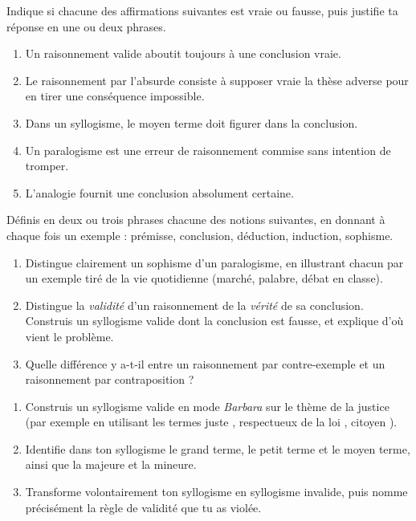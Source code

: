 \documentclass[11pt]{article}
\newcommand{\cle}[1]{{\popxbold\color{popdark}#1}}
\newcounter{popsec}
\newcounter{popsub}
\newcommand{\courssub}[1]{%
  \stepcounter{popsub}%
  \par\vspace{9pt}\noindent{\popxbold\fontsize{11.5}{13}\selectfont\color{popink}{\color{poporange}\thepopsec.\thepopsub}\hspace{6pt}#1}\par\nopagebreak\vspace{4pt}
}
\begin{document}
\begin{exercice}
Indique si chacune des affirmations suivantes est vraie ou fausse, puis justifie ta réponse en une ou deux phrases.

\begin{enumerate}
\item Un raisonnement valide aboutit toujours à une conclusion vraie.
\item Le raisonnement par l'absurde consiste à supposer vraie la thèse adverse pour en tirer une conséquence impossible.
\item Dans un syllogisme, le moyen terme doit figurer dans la conclusion.
\item Un paralogisme est une erreur de raisonnement commise sans intention de tromper.
\item L'analogie fournit une conclusion absolument certaine.
\end{enumerate}
\end{exercice}

\begin{exercice}[Définitions]
Définis en deux ou trois phrases chacune des notions suivantes, en donnant à chaque fois un exemple : \cle{prémisse}, \cle{conclusion}, \cle{déduction}, \cle{induction}, \cle{sophisme}.
\end{exercice}

\begin{exercice}
\begin{enumerate}
\item Distingue clairement un \cle{sophisme} d'un \cle{paralogisme}, en illustrant chacun par un exemple tiré de la vie quotidienne (marché, palabre, débat en classe).
\item Distingue la \emph{validité} d'un raisonnement de la \emph{vérité} de sa conclusion. Construis un syllogisme valide dont la conclusion est fausse, et explique d'où vient le problème.
\item Quelle différence y a-t-il entre un raisonnement par \cle{contre-exemple} et un raisonnement par \cle{contraposition} ?
\end{enumerate}
\end{exercice}

\courssub{Je m'entraîne}

\begin{exercice}
\begin{enumerate}
\item Construis un syllogisme valide en mode \emph{Barbara} sur le thème de la justice (par exemple en utilisant les termes \guillemotleft juste \guillemotright, \guillemotleft respectueux de la loi \guillemotright, \guillemotleft citoyen \guillemotright).
\item Identifie dans ton syllogisme le grand terme, le petit terme et le moyen terme, ainsi que la majeure et la mineure.
\item Transforme volontairement ton syllogisme en syllogisme invalide, puis nomme précisément la règle de validité que tu as violée.
\end{enumerate}
\end{exercice}
\end{document}
